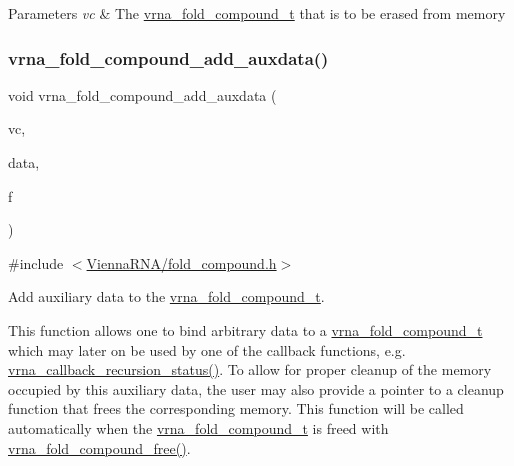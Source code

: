 \begin{DoxyParams}{Parameters}
{\em vc} & The \mbox{\hyperlink{group__fold__compound_ga1b0cef17fd40466cef5968eaeeff6166}{vrna\+\_\+fold\+\_\+compound\+\_\+t}} that is to be erased from memory \\
\hline
\end{DoxyParams}
\mbox{\label{group__fold__compound_ga6316a9426bea2f742375e8df6febd3f6}} 
\subsubsection{\texorpdfstring{vrna\+\_\+fold\+\_\+compound\+\_\+add\+\_\+auxdata()}{vrna\_fold\_compound\_add\_auxdata()}}
{\footnotesize\ttfamily void vrna\+\_\+fold\+\_\+compound\+\_\+add\+\_\+auxdata (\begin{DoxyParamCaption}\item[{\mbox{\hyperlink{group__fold__compound_ga1b0cef17fd40466cef5968eaeeff6166}{vrna\+\_\+fold\+\_\+compound\+\_\+t}} $\ast$}]{vc,  }\item[{void $\ast$}]{data,  }\item[{\mbox{\hyperlink{group__fold__compound_ga7806651f51b195013839a218b3bbd5a3}{vrna\+\_\+callback\+\_\+free\+\_\+auxdata}} $\ast$}]{f }\end{DoxyParamCaption})}



{\ttfamily \#include $<$\mbox{\hyperlink{fold__compound_8h}{Vienna\+R\+N\+A/fold\+\_\+compound.\+h}}$>$}



Add auxiliary data to the \mbox{\hyperlink{group__fold__compound_ga1b0cef17fd40466cef5968eaeeff6166}{vrna\+\_\+fold\+\_\+compound\+\_\+t}}. 

This function allows one to bind arbitrary data to a \mbox{\hyperlink{group__fold__compound_ga1b0cef17fd40466cef5968eaeeff6166}{vrna\+\_\+fold\+\_\+compound\+\_\+t}} which may later on be used by one of the callback functions, e.\+g. \mbox{\hyperlink{group__fold__compound_gac86036fa8cad1108832335063243cdc8}{vrna\+\_\+callback\+\_\+recursion\+\_\+status()}}. To allow for proper cleanup of the memory occupied by this auxiliary data, the user may also provide a pointer to a cleanup function that free\textquotesingle{}s the corresponding memory. This function will be called automatically when the \mbox{\hyperlink{group__fold__compound_ga1b0cef17fd40466cef5968eaeeff6166}{vrna\+\_\+fold\+\_\+compound\+\_\+t}} is free\textquotesingle{}d with \mbox{\hyperlink{group__fold__compound_gadded6039d63f5d6509836e20321534ad}{vrna\+\_\+fold\+\_\+compound\+\_\+free()}}.

